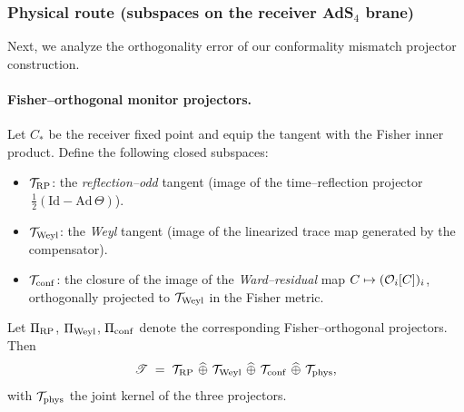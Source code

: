 \documentclass[10pt]{article}
\theoremstyle{definition}
\theoremstyle{plain}
\begin{document}
\subsubsection*{\texorpdfstring{Physical route (subspaces on the receiver AdS$_4$ brane)}{Physical route (subspaces on the receiver AdS4 brane)}}\label{subsubsec:uom-main-006}
Next, we analyze the orthogonality error of our conformality mismatch projector construction.

\paragraph{Fisher–orthogonal monitor projectors.}\label{par:uom-main-052}
Let $C_\ast$ be the receiver fixed point and equip the tangent with the Fisher inner product.
Define the following closed subspaces:
\begin{itemize}
\item $\mathcal T_{\rm RP}$: the \emph{reflection–odd} tangent (image of the time–reflection
projector $\,\tfrac12(\mathrm{Id}-\mathrm{Ad}\,\Theta)$).
\item $\mathcal T_{\rm Weyl}$: the \emph{Weyl} tangent (image of the linearized trace map generated by the compensator).
\item $\mathcal T_{\rm conf}$: the closure of the image of the \emph{Ward–residual} map
$C\mapsto ({\cal O}_i[C])_{i}$, orthogonally projected to $\mathcal T_{\rm Weyl}$ in the Fisher metric.
\end{itemize}
Let $\Pi_{\rm RP}$, $\Pi_{\rm Weyl}$, $\Pi_{\rm conf}$ denote the corresponding Fisher–orthogonal projectors.
Then
\[
\mathscr T\;=\;\mathcal T_{\rm RP}\ \widehat\oplus\ \mathcal T_{\rm Weyl}\ \widehat\oplus\ \mathcal T_{\rm conf}\ \widehat\oplus\ \mathcal T_{\rm phys},
\]
with $\mathcal T_{\rm phys}$ the joint kernel of the three projectors.
\end{document}
